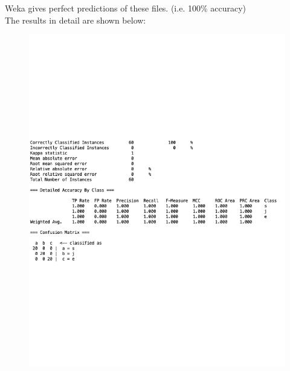 \documentclass[a4paper]{article}
\theoremstyle{definition}
\newenvironment{soln}{
    \leavevmode\color{blue}\ignorespaces
}{}
\begin{document}
\begin{itemize}
\begin{soln}
Weka gives perfect predictions of these files. (i.e. 100\% accuracy)\\
The results in detail are shown below:
	   \begin{figure}[H]
	        \centering
	        \includegraphics[width=1.0\textwidth]{result.pdf}
	        \captionsetup{labelformat=empty}
	        \caption{}
	        \label{fig:my_label}
	   \end{figure}
\end{soln}

\end{itemize}

\end{document}
